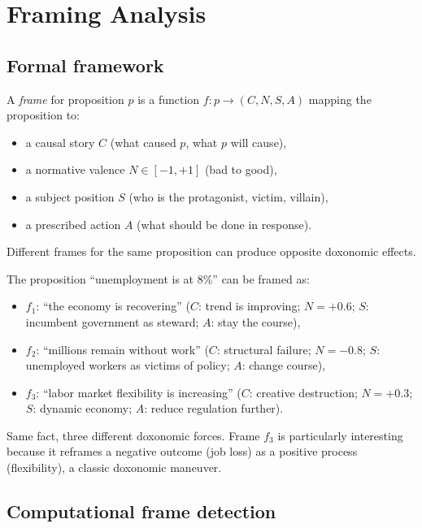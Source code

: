 \section{Framing Analysis}
\label{sec:ch17-framing}

\subsection{Formal framework}

\begin{definition}[Frame]
\label{def:frame}
A \emph{frame} for proposition $p$ is a function $f: p \to (C, N, S, A)$ mapping the proposition to:
\begin{itemize}[nosep]
  \item a causal story $C$ (what caused $p$, what $p$ will cause),
  \item a normative valence $N \in [-1, +1]$ (bad to good),
  \item a subject position $S$ (who is the protagonist, victim, villain),
  \item a prescribed action $A$ (what should be done in response).
\end{itemize}
Different frames for the same proposition can produce opposite doxonomic effects.
\end{definition}

\begin{example}
\label{ex:unemployment-frames}
The proposition ``unemployment is at 8\%'' can be framed as:
\begin{itemize}[nosep]
  \item $f_1$: ``the economy is recovering'' ($C$: trend is improving; $N = +0.6$; $S$: incumbent government as steward; $A$: stay the course),
  \item $f_2$: ``millions remain without work'' ($C$: structural failure; $N = -0.8$; $S$: unemployed workers as victims of policy; $A$: change course),
  \item $f_3$: ``labor market flexibility is increasing'' ($C$: creative destruction; $N = +0.3$; $S$: dynamic economy; $A$: reduce regulation further).
\end{itemize}
Same fact, three different doxonomic forces.
Frame $f_3$ is particularly interesting because it reframes a negative outcome (job loss) as a positive process (flexibility), a classic doxonomic maneuver.
\end{example}

\subsection{Computational frame detection}

